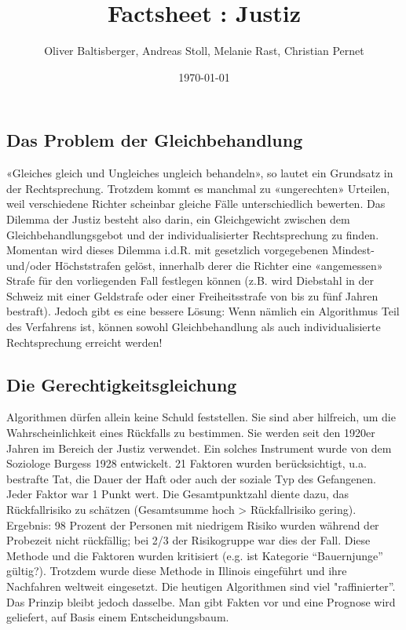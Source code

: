 \documentclass{article}
\title{Factsheet : Justiz}
\author{Oliver Baltisberger, Andreas Stoll, Melanie Rast, Christian Pernet}
\date{\today}
\begin{document}
	\maketitle
\subsection*{Das Problem der Gleichbehandlung}
«Gleiches gleich und Ungleiches ungleich behandeln», so lautet ein Grundsatz in der Rechtsprechung. Trotzdem kommt es manchmal zu «ungerechten» Urteilen, weil verschiedene Richter scheinbar gleiche Fälle unterschiedlich bewerten. Das Dilemma der Justiz besteht also darin, ein Gleichgewicht zwischen dem Gleichbehandlungsgebot und der individualisierter Rechtsprechung zu finden. Momentan wird dieses Dilemma i.d.R. mit gesetzlich vorgegebenen Mindest- und/oder Höchststrafen gelöst, innerhalb derer die Richter eine «angemessen» Strafe für den vorliegenden Fall festlegen können (z.B. wird Diebstahl in der Schweiz mit einer Geldstrafe oder einer Freiheitsstrafe von bis zu fünf Jahren bestraft). Jedoch gibt es eine bessere Lösung: Wenn nämlich ein Algorithmus Teil des Verfahrens ist, können sowohl Gleichbehandlung als auch individualisierte Rechtsprechung erreicht werden! 

\subsection*{Die Gerechtigkeitsgleichung} 

Algorithmen dürfen allein keine Schuld feststellen. Sie sind aber hilfreich, um die Wahrscheinlichkeit eines Rückfalls zu bestimmen. Sie werden seit den 1920er Jahren im Bereich der Justiz verwendet.  Ein solches Instrument wurde von dem Soziologe Burgess 1928 entwickelt. 21 Faktoren wurden berücksichtigt, u.a. bestrafte Tat, die Dauer der Haft oder auch der soziale Typ des Gefangenen. Jeder Faktor war 1 Punkt wert. Die Gesamtpunktzahl diente dazu, das Rückfallrisiko zu schätzen (Gesamtsumme hoch > Rückfallrisiko gering). Ergebnis: 98 Prozent der Personen mit niedrigem Risiko wurden während der Probezeit nicht rückfällig; bei 2/3 der Risikogruppe war dies der Fall. Diese Methode und die Faktoren wurden kritisiert (e.g. ist Kategorie “Bauernjunge” gültig?). Trotzdem wurde diese Methode in Illinois eingeführt und ihre Nachfahren weltweit eingesetzt. Die heutigen Algorithmen sind viel "raffinierter”. Das Prinzip bleibt jedoch dasselbe. Man gibt Fakten vor und eine Prognose wird geliefert, auf Basis einem Entscheidungsbaum. 
\end{document}
